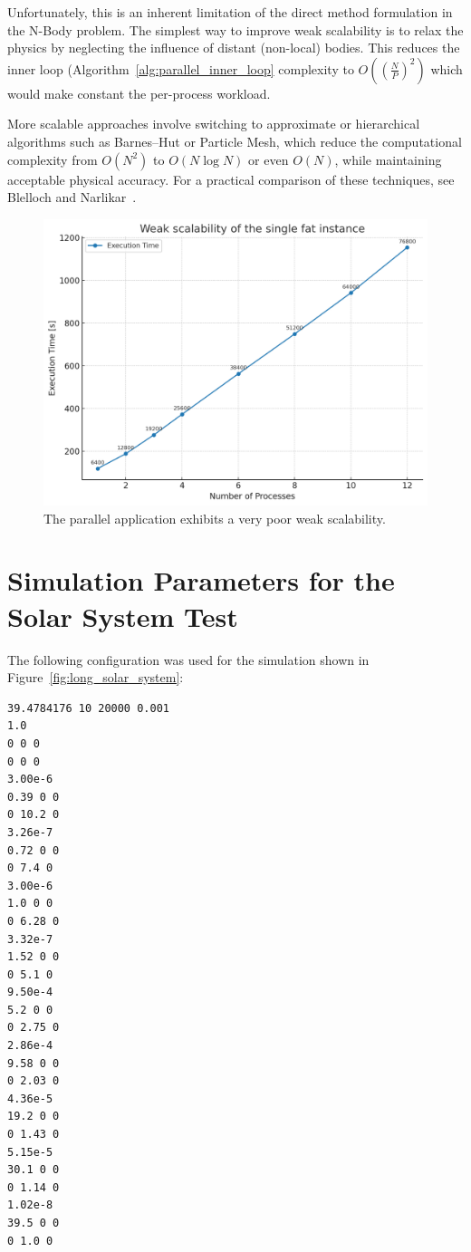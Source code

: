 \documentclass{article}
\begin{document}
Unfortunately, this is an inherent limitation of the direct method formulation in the N-Body problem.
The simplest way to improve weak scalability is to relax the physics by neglecting the influence of distant (non-local) bodies. This reduces the inner loop (Algorithm~\ref{alg:parallel_inner_loop} complexity to $O((\frac{N}{P})^2)$ which would make constant the per-process workload.

More scalable approaches involve switching to approximate or hierarchical algorithms such as Barnes–Hut or Particle Mesh, which reduce the computational complexity from $O(N^2)$ to $O(N \log N)$ or even $O(N)$, while maintaining acceptable physical accuracy. For a practical comparison of these techniques, see Blelloch and Narlikar~\cite{blelloch1997practical}.

\begin{figure}[H]
\centering
\includegraphics[width=0.8\linewidth]{parallel_weak_scalability.png}
\caption{The parallel application exhibits a very poor weak scalability.}
\label{fig:empirical_weak_scalability}
\end{figure}



\appendix


\section[Simulation Parameters (Solar System)]{Simulation Parameters for the Solar System Test}
\label{appendix:solar_params}

The following configuration was used for the simulation shown in Figure~\ref{fig:long_solar_system}:

\begin{verbatim}
39.4784176 10 20000 0.001
1.0
0 0 0
0 0 0
3.00e-6
0.39 0 0
0 10.2 0
3.26e-7
0.72 0 0
0 7.4 0
3.00e-6
1.0 0 0
0 6.28 0
3.32e-7
1.52 0 0
0 5.1 0
9.50e-4
5.2 0 0
0 2.75 0
2.86e-4
9.58 0 0
0 2.03 0
4.36e-5
19.2 0 0
0 1.43 0
5.15e-5
30.1 0 0
0 1.14 0
1.02e-8
39.5 0 0
0 1.0 0
\end{verbatim}
\end{document}
